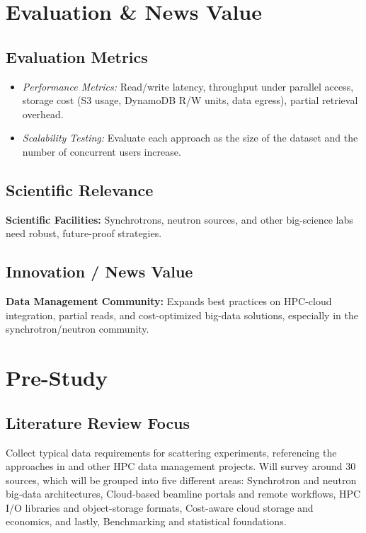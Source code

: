 \documentclass{article}
\begin{document}
\section{Evaluation \& News Value}

\subsection{Evaluation Metrics}
\begin{itemize}
    \item \emph{Performance Metrics:} Read/write latency, throughput under parallel access, storage cost (S3 usage, DynamoDB R/W units, data egress), partial retrieval overhead.
    \item \emph{Scalability Testing:} Evaluate each approach as the size of the dataset and the number of concurrent users increase.
\end{itemize}


\subsection{Scientific Relevance}
\textbf{Scientific Facilities:} Synchrotrons, neutron sources, and other big-science labs need robust, future-proof strategies.


\subsection{Innovation / News Value}
\textbf{Data Management Community:} Expands best practices on HPC-cloud integration, partial reads, and cost-optimized big-data solutions, especially in the synchrotron/neutron community.






\section{Pre-Study}

\subsection{Literature Review Focus}
Collect typical data requirements for scattering experiments, referencing the approaches in \cite{wang2018synchrotron, meyer2014store, moriyama2019public, kek2021aws, godoy2021efficient} and other HPC data management projects. Will survey around 30 sources, which will be grouped into five different areas: Synchrotron and neutron big‐data architectures, Cloud‐based beamline portals and remote workflows, HPC I/O libraries and object-storage formats, Cost-aware cloud storage and economics, and lastly, Benchmarking and statistical foundations.
\end{document}
